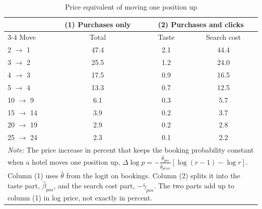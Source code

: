 \begin{table}[htbp]
\centering
\caption{Price equivalent of moving one position up}
\label{tab:price_equivalent}
\begin{tabular}{lccc}
\toprule
 & (1) Purchases only & \multicolumn{2}{c}{(2) Purchases and clicks} \\
\cmidrule(lr){3-4}
Move & Total & Taste & Search cost \\
\midrule
2 $\to$ 1 & 47.4 & 2.1 & 44.4 \\
3 $\to$ 2 & 25.5 & 1.2 & 24.0 \\
4 $\to$ 3 & 17.5 & 0.9 & 16.5 \\
5 $\to$ 4 & 13.3 & 0.7 & 12.5 \\
10 $\to$ 9 & 6.1 & 0.3 & 5.7 \\
15 $\to$ 14 & 3.9 & 0.2 & 3.7 \\
20 $\to$ 19 & 2.9 & 0.2 & 2.8 \\
25 $\to$ 24 & 2.3 & 0.1 & 2.2 \\
\bottomrule
\multicolumn{4}{p{0.9\linewidth}}{\footnotesize \textit{Note:} The price increase in percent that keeps the booking probability constant when a hotel moves one position up, $\Delta \log p = -\frac{\hat\theta_{pos}}{\hat\theta_{price}}\left[\log(r-1) - \log r\right]$. Column (1) uses $\hat\theta$ from the logit on bookings. Column (2) splits it into the taste part, $\hat\beta_{pos}$, and the search cost part, $-\hat\gamma_{pos}$. The two parts add up to column (1) in log price, not exactly in percent.} \\
\end{tabular}
\end{table}
